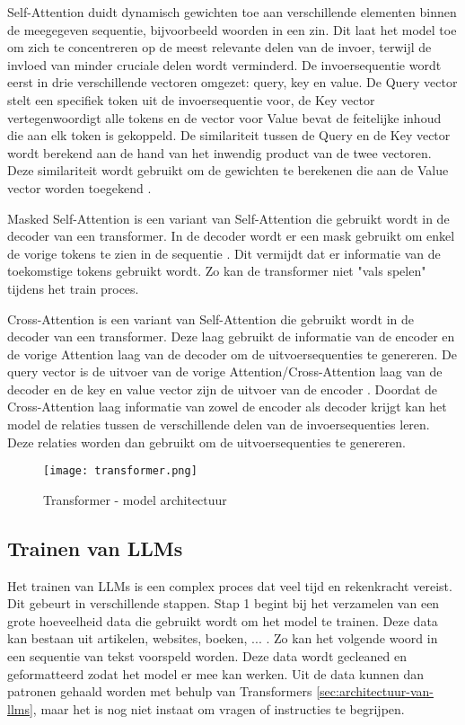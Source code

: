 Self-Attention duidt dynamisch gewichten toe aan verschillende elementen binnen de meegegeven sequentie, bijvoorbeeld woorden in een zin.
Dit laat het model toe om zich te concentreren op de meest relevante delen van de invoer, terwijl de invloed van minder cruciale delen wordt verminderd.
De invoersequentie wordt eerst in drie verschillende vectoren omgezet: query, key en value.
De Query vector stelt een specifiek token uit de invoersequentie voor, de Key vector vertegenwoordigt alle tokens en de vector voor Value bevat de feitelijke inhoud die aan elk token is gekoppeld.
De similariteit tussen de Query en de Key vector wordt berekend aan de hand van het inwendig product van de twee vectoren.
Deze similariteit wordt gebruikt om de gewichten te berekenen die aan de Value vector worden toegekend \autocite{VaswaniEtAl2017}.

Masked Self-Attention is een variant van Self-Attention die gebruikt wordt in de decoder van een transformer.
In de decoder wordt er een mask gebruikt om enkel de vorige tokens te zien in de sequentie \autocite{VaswaniEtAl2017}.
Dit vermijdt dat er informatie van de toekomstige tokens gebruikt wordt. 
Zo kan de transformer niet "vals spelen" tijdens het train proces.

Cross-Attention is een variant van Self-Attention die gebruikt wordt in de decoder van een transformer.
Deze laag gebruikt de informatie van de encoder en de vorige Attention laag van de decoder om de uitvoersequenties te genereren.
De query vector is de uitvoer van de vorige Attention/Cross-Attention laag van de decoder en de key en value vector zijn de uitvoer van de encoder \autocite{VaswaniEtAl2017}.
Doordat de Cross-Attention laag informatie van zowel de encoder als decoder krijgt kan het model de relaties tussen de verschillende delen van de invoersequenties leren.
Deze relaties worden dan gebruikt om de uitvoersequenties te genereren.

\begin{figure}[h]
  \centering
  \texttt{[image: transformer.png]}
  \caption{Transformer - model architectuur \autocite{VaswaniEtAl2017}}
  \label{fig:transformer-model}
\end{figure}

\subsection{Trainen van LLMs}
\label{sec:trainen-van-llms}
Het trainen van LLMs is een complex proces dat veel tijd en rekenkracht vereist. Dit gebeurt in verschillende stappen.
Stap 1 begint bij het verzamelen van een grote hoeveelheid data die gebruikt wordt om het model te trainen.
Deze data kan bestaan uit artikelen, websites, boeken, ... . Zo kan het volgende woord in een sequentie van tekst voorspeld worden.
Deze data wordt gecleaned en geformatteerd zodat het model er mee kan werken.
Uit de data kunnen dan patronen gehaald worden met behulp van Transformers \ref{sec:architectuur-van-llms}, maar het is nog niet instaat om vragen of instructies te begrijpen.

